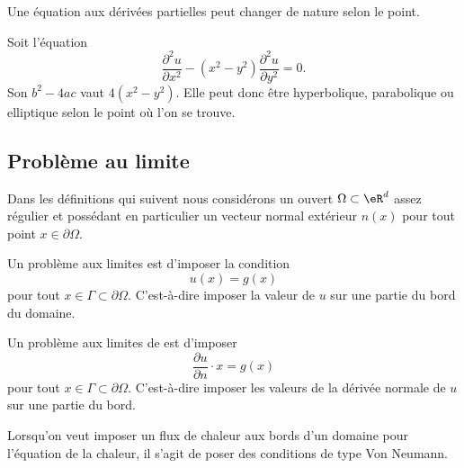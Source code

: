 Une équation aux dérivées partielles peut changer de nature selon le point.

\begin{example}
    Soit l'équation
    \begin{equation}
        \frac{ \partial^2u }{ \partial x^2 }-(x^2-y^2)\frac{ \partial^2u }{ \partial y^2 }=0.
    \end{equation}
    Son \( b^2-4ac\) vaut \( 4(x^2-y^2)\). Elle peut donc être hyperbolique, parabolique ou elliptique selon le point où l'on se trouve.
\end{example}

\subsection{Problème au limite}

Dans les définitions qui suivent nous considérons un ouvert \( \Omega\subset \eR^d\) assez régulier et possédant en particulier un vecteur normal extérieur \( n(x)\) pour tout point \( x\in\partial\Omega\).

\begin{definition}
    Un problème aux limites  est d'imposer la condition
    \begin{equation}
        u(x)=g(x)
    \end{equation}
    pour tout \( x\in\Gamma\subset \partial\Omega\). C'est-à-dire imposer la valeur de \( u\) sur une partie du bord du domaine.
\end{definition}

\begin{definition}
    Un problème aux limites de  est d'imposer
    \begin{equation}
        \frac{ \partial u }{ \partial n }\cdot x=g(x)
    \end{equation}
    pour tout \( x\in\Gamma\subset\partial\Omega\). C'est-à-dire imposer les valeurs de la dérivée normale de \( u\) sur une partie du bord.
\end{definition}

\begin{example}
    Lorsqu'on veut imposer un flux de chaleur aux bords d'un domaine pour l'équation de la chaleur, il s'agit de poser des conditions de type Von Neumann.
\end{example}

